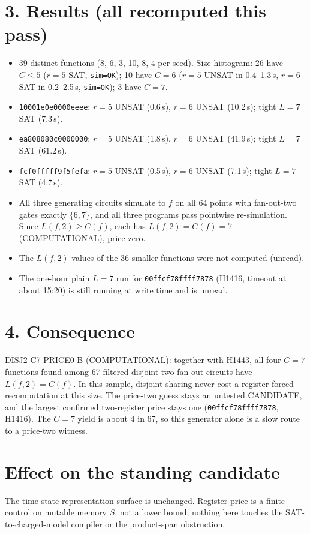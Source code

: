 \documentclass[11pt]{article}
\begin{document}
\section*{3. Results (all recomputed this pass)}
\begin{itemize}
\item 39 distinct functions (8, 6, 3, 10, 8, 4 per seed). Size histogram: 26 have $C\le5$ ($r=5$ SAT, \texttt{sim=OK}); 10 have $C=6$ ($r=5$ UNSAT in 0.4--1.3\,s, $r=6$ SAT in 0.2--2.5\,s, \texttt{sim=OK}); 3 have $C=7$.
\item \texttt{10001e0e0000eeee}: $r=5$ UNSAT (0.6\,s), $r=6$ UNSAT (10.2\,s); tight $L=7$ SAT (7.3\,s).
\item \texttt{ea808080c0000000}: $r=5$ UNSAT (1.8\,s), $r=6$ UNSAT (41.9\,s); tight $L=7$ SAT (61.2\,s).
\item \texttt{fcf0fffff9f5fefa}: $r=5$ UNSAT (0.5\,s), $r=6$ UNSAT (7.1\,s); tight $L=7$ SAT (4.7\,s).
\item All three generating circuits simulate to $f$ on all 64 points with fan-out-two gates exactly $\{6,7\}$, and all three programs pass pointwise re-simulation. Since $L(f,2)\ge C(f)$, each has $L(f,2)=C(f)=7$ (COMPUTATIONAL), price zero.
\item The $L(f,2)$ values of the 36 smaller functions were not computed (unread).
\item The one-hour plain $L=7$ run for \texttt{00ffcf78ffff7878} (H1416, timeout at about 15:20) is still running at write time and is unread.
\end{itemize}

\section*{4. Consequence}
DISJ2-C7-PRICE0-B (COMPUTATIONAL): together with H1443, all four $C=7$ functions found among 67 filtered disjoint-two-fan-out circuits have $L(f,2)=C(f)$. In this sample, disjoint sharing never cost a register-forced recomputation at this size. The price-two guess stays an untested CANDIDATE, and the largest confirmed two-register price stays one (\texttt{00ffcf78ffff7878}, H1416). The $C=7$ yield is about 4 in 67, so this generator alone is a slow route to a price-two witness.

\section*{Effect on the standing candidate}
The time-state-representation surface is unchanged. Register price is a finite control on mutable memory $S$, not a lower bound; nothing here touches the SAT-to-charged-model compiler or the product-span obstruction.
\end{document}
